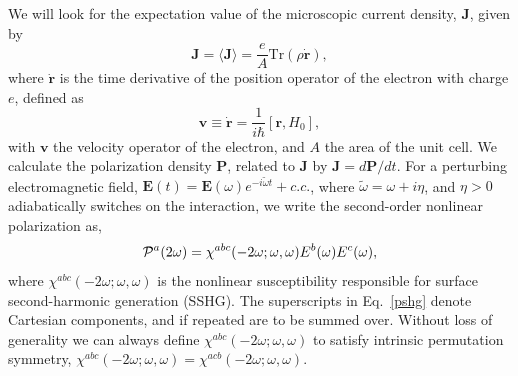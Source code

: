 \documentclass[floatfix,prb,aps,superscriptaddress,showpacs,letterpaper]{revtex4}
\begin{document}
We will look for the expectation value of the microscopic current density, 
$\mathbf{J}$, given by 
\begin{equation*}
\mathbf{J} = \langle{\mathbf{J}}\rangle 
           = \frac{e}{A}\mbox{Tr}({\rho}\dot{\mathbf{r}}),
\end{equation*}
where $\dot{\mathbf{r}}$ is the time derivative of the position operator of the
electron with charge $e$, defined as
\begin{equation}
\mathbf{v}\equiv \dot{\mathbf{r}}=\frac{1}{i\hbar }[\mathbf{r},H_0],  
\label{mv}
\end{equation}
with $\mathbf{v}$ the velocity operator of the electron, and $A$ the
area of the unit cell. We calculate the polarization density 
$\mathbf{P}$, related to $\mathbf{J}$ by
$\mathbf{J}=d\mathbf{P}/dt$. For a 
perturbing electromagnetic field, $\mathbf{E}(t)=
\mathbf{E}(\omega )e^{-i\tilde{\omega} t}+c.c.$,
where $\tilde\omega=\omega+i\eta $,
and $\eta >0$ adiabatically switches on the interaction,
we write the second-order nonlinear
polarization as, 
\begin{equation}
{\mathbf{\cal P}}^a(2\omega)=\chi ^{abc}(-2\omega;\omega,\omega)E^{b}(\omega)E^{c}(\omega),  
\label{pshg}
\end{equation}
where $\chi^{abc}(-2\omega ;\omega ,\omega )$ is the nonlinear
susceptibility responsible for surface second-harmonic generation
(SSHG). 
The 
superscripts in Eq.~\eqref{pshg} denote Cartesian components, and if
repeated are to be summed over. Without loss of generality we can always
define $\chi^{abc}(-2\omega;\omega,\omega)$
 to satisfy intrinsic permutation
symmetry, 
$\chi^{abc}(-2\omega ;\omega ,\omega )=\chi ^{acb}(-2\omega ;\omega
,\omega )$.
\end{document}
